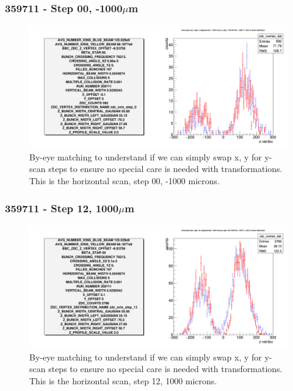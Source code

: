 \begin{frame}
  \frametitle{359711 - Step 00, -1000$\mu$m}
  \begin{center}
    \begin{figure}
      \includegraphics[width=\linewidth]{./figures/step_00_transf}
      \caption{
        By-eye matching to understand if we can simply swap x, y for y-scan
        steps to ensure no special care is needed with transformations. This is
        the horizontal scan, step 00, -1000 microns.
      }
      \label{fig:step_00_transf}
    \end{figure}
  \end{center}
\end{frame}

\begin{frame}
  \frametitle{359711 - Step 12, 1000$\mu$m}
  \begin{center}
    \begin{figure}
      \includegraphics[width=\linewidth]{./figures/step_12_transf}
      \caption{
        By-eye matching to understand if we can simply swap x, y for y-scan
        steps to ensure no special care is needed with transformations. This is
        the horizontal scan, step 12, 1000 microns.
      }
      \label{fig:step_12_transf}
    \end{figure}
  \end{center}
\end{frame}

